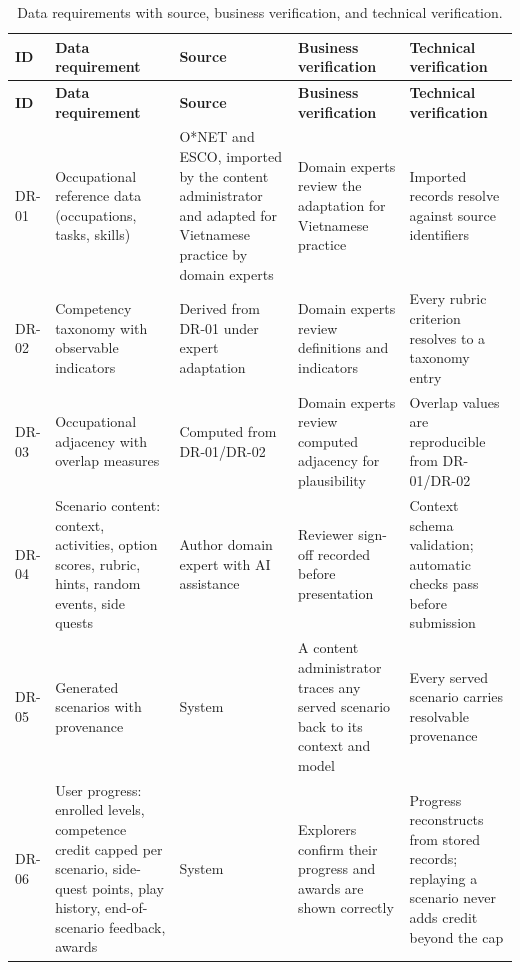 {\small{}\renewcommand{\arraystretch}{1.1}
\begin{longtable}{|>{\raggedright\arraybackslash}p{}|>{\raggedright\arraybackslash}p{}|>{\raggedright\arraybackslash}p{}|>{\raggedright\arraybackslash}p{}|>{\raggedright\arraybackslash}p{}|}
\caption{Data requirements with source, business verification, and technical verification.} \\
\hline
\textbf{ID} & \textbf{Data requirement} & \textbf{Source} & \textbf{Business verification} & \textbf{Technical verification} \\ \hline
\endfirsthead
\hline
\textbf{ID} & \textbf{Data requirement} & \textbf{Source} & \textbf{Business verification} & \textbf{Technical verification} \\ \hline
\endhead
DR-01 & Occupational reference data (occupations, tasks, skills) & O*NET and ESCO, imported by the content administrator and adapted for Vietnamese practice by domain experts & Domain experts review the adaptation for Vietnamese practice & Imported records resolve against source identifiers \\ \hline
DR-02 & Competency taxonomy with observable indicators & Derived from DR-01 under expert adaptation & Domain experts review definitions and indicators & Every rubric criterion resolves to a taxonomy entry \\ \hline
DR-03 & Occupational adjacency with overlap measures & Computed from DR-01/DR-02 & Domain experts review computed adjacency for plausibility & Overlap values are reproducible from DR-01/DR-02 \\ \hline
DR-04 & Scenario content: context, activities, option scores, rubric, hints, random events, side quests & Author domain expert with AI assistance & Reviewer sign-off recorded before presentation & Context schema validation; automatic checks pass before submission \\ \hline
DR-05 & Generated scenarios with provenance & System & A content administrator traces any served scenario back to its context and model & Every served scenario carries resolvable provenance \\ \hline
DR-06 & User progress: enrolled levels, competence credit capped per scenario, side-quest points, play history, end-\allowbreak{}of-\allowbreak{}scenario feedback, awards & System & Explorers confirm their progress and awards are shown correctly & Progress reconstructs from stored records; replaying a scenario never adds credit beyond the cap \\ \hline

\end{longtable}}
